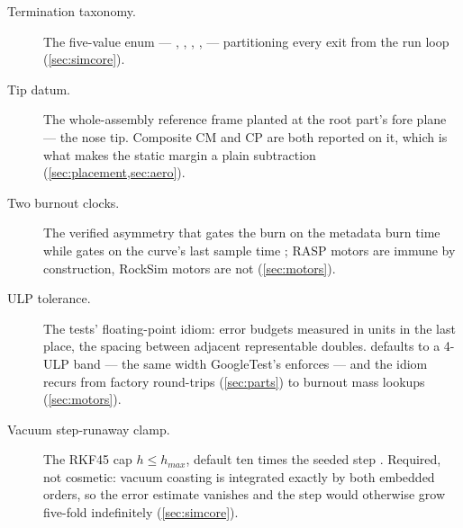 \begin{description}
\item[Termination taxonomy.] The five-value  enum ---
  , , , ,
   --- partitioning every exit from the run loop
   (\cref{sec:simcore}).

\item[Tip datum.] The whole-assembly reference frame planted at the root part's fore plane
  --- the nose tip. Composite CM and CP are both reported on it, which is what makes the
  static margin a plain subtraction 
  (\cref{sec:placement,sec:aero}).

\item[Two burnout clocks.] The verified asymmetry that  gates the burn on the
  metadata burn time  while  gates on the
  curve's last sample time ; RASP motors are immune by
  construction, RockSim motors are not (\cref{sec:motors}).

\item[ULP tolerance.] The tests' floating-point idiom: error budgets measured in units in
  the last place, the spacing between adjacent representable doubles.
   defaults to a 4-ULP band
   --- the same width GoogleTest's
   enforces --- and the idiom recurs from factory round-trips
  (\cref{sec:parts}) to burnout mass lookups (\cref{sec:motors}).

\item[Vacuum step-runaway clamp.] The RKF45 cap $h \le h_{max}$, default ten times the
  seeded step . Required, not cosmetic: vacuum coasting is
  integrated exactly by both embedded orders, so the error estimate vanishes and the step
  would otherwise grow five-fold indefinitely (\cref{sec:simcore}).

\end{description}
